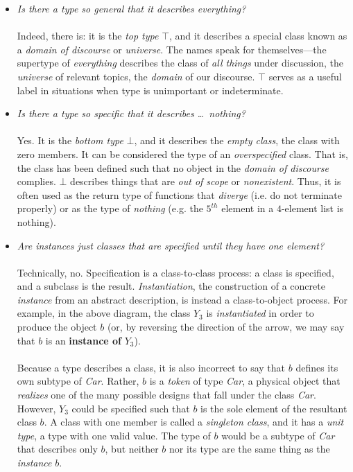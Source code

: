 \begin{itemize}
	\item \textit{Is there a type so general that it describes everything?} \\\\	
	Indeed, there is: it is the \textit{top type} $\top$, and it describes a special class known as a \textit{domain of discourse} or \textit{universe}. The names speak for themselves---the supertype of \textit{everything} describes the class of \textit{all things} under discussion, the \textit{universe} of relevant topics, the \textit{domain} of our discourse. $\top$ serves as a useful label in situations when type is unimportant or indeterminate.
	\item \textit{Is there a type so specific that it describes \dots\ nothing?} \\\\
	Yes. It is the \textit{bottom type} $\bot$, and it describes the \textit{empty class}, the class with zero members. It can be considered the type of an \textit{overspecified} class. That is, the class has been defined such that no object in the \textit{domain of discourse} complies. $\bot$ describes things that are \textit{out of scope} or \textit{nonexistent}. Thus, it is often used as the return type of functions that \textit{diverge} (i.e. do not terminate properly) or as the type of \textit{nothing} (e.g. the $5^{th}$ element in a $4$-element list is nothing).
	\item \textit{Are instances just classes that are specified until they have one element?} \\\\
	Technically, no. Specification is a class-to-class process: a class is specified, and a subclass is the result. \textit{Instantiation}, the construction of a concrete \textit{instance} from an abstract description, is instead a class-to-object process. For example, in the above diagram, the class $Y_3$ is \textit{instantiated} in order to produce the object $b$ (or, by reversing the direction of the arrow, we may say that $b$ is an \textbf{instance of} $Y_3$). \\\\
	Because a type describes a class, it is also incorrect to say that $b$ defines its own subtype of \textit{Car}. Rather, $b$ is a \textit{token} of type \textit{Car}, a physical object that \textit{realizes} one of the many possible designs that fall under the class \textit{Car}. However, $Y_3$ could be specified such that $b$ is the sole element of the resultant class ${b}$. A class with one member is called a \textit{singleton class}, and it has a \textit{unit type}, a type with one valid value. The type of ${b}$ would be a subtype of \textit{Car} that describes only $b$, but neither ${b}$ nor its type are the same thing as the \textit{instance} $b$. \\
\end{itemize}

